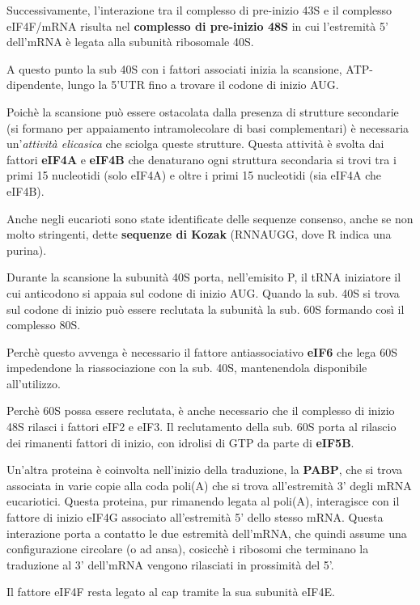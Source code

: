\documentclass[]{article}
\begin{document}
Successivamente, l'interazione tra il complesso di pre-inizio 43S e il
complesso eIF4F/mRNA risulta nel \textbf{complesso di pre-inizio 48S} in
cui l'estremità 5' dell'mRNA è legata alla subunità ribosomale 40S.

A questo punto la sub 40S con i fattori associati inizia la scansione,
ATP-dipendente, lungo la 5'UTR fino a trovare il codone di inizio AUG.

Poichè la scansione può essere ostacolata dalla presenza di strutture
secondarie (si formano per appaiamento intramolecolare di basi
complementari) è necessaria un'\emph{attività elicasica} che sciolga
queste strutture. Questa attività è svolta dai fattori \textbf{eIF4A} e
\textbf{eIF4B} che denaturano ogni struttura secondaria si trovi tra i
primi 15 nucleotidi (solo eIF4A) e oltre i primi 15 nucleotidi (sia
eIF4A che eIF4B).

Anche negli eucarioti sono state identificate delle sequenze consenso,
anche se non molto stringenti, dette \textbf{sequenze di Kozak}
(RNNAUGG, dove R indica una purina).

Durante la scansione la subunità 40S porta, nell'emisito P, il tRNA
iniziatore il cui anticodono si appaia sul codone di inizio AUG. Quando
la sub. 40S si trova sul codone di inizio può essere reclutata la
subunità la sub. 60S formando così il complesso 80S.

Perchè questo avvenga è necessario il fattore antiassociativo
\textbf{eIF6} che lega 60S impedendone la riassociazione con la sub.
40S, mantenendola disponibile all'utilizzo.

Perchè 60S possa essere reclutata, è anche necessario che il complesso
di inizio 48S rilasci i fattori eIF2 e eIF3. Il reclutamento della sub.
60S porta al rilascio dei rimanenti fattori di inizio, con idrolisi di
GTP da parte di \textbf{eIF5B}.

Un'altra proteina è coinvolta nell'inizio della traduzione, la
\textbf{PABP}, che si trova associata in varie copie alla coda poli(A)
che si trova all'estremità 3' degli mRNA eucariotici. Questa proteina,
pur rimanendo legata al poli(A), interagisce con il fattore di inizio
eIF4G associato all'estremità 5' dello stesso mRNA. Questa interazione
porta a contatto le due estremità dell'mRNA, che quindi assume una
configurazione circolare (o ad ansa), cosicchè i ribosomi che terminano
la traduzione al 3' dell'mRNA vengono rilasciati in prossimità del 5'.

Il fattore eIF4F resta legato al cap tramite la sua subunità eIF4E.
\end{document}
